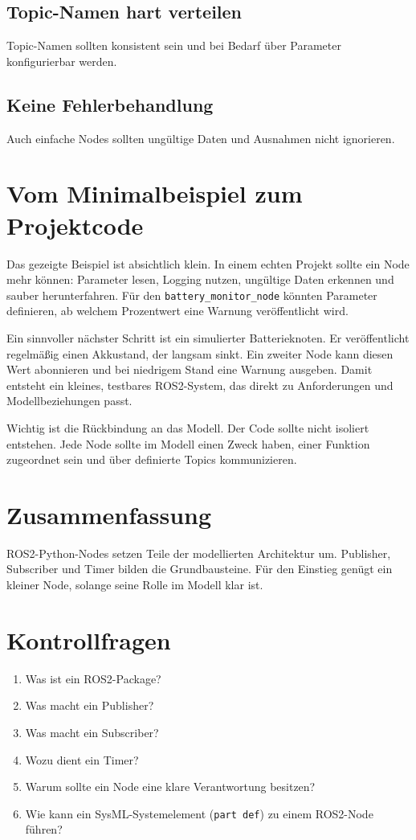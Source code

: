 \subsection{Topic-Namen hart verteilen}
Topic-Namen sollten konsistent sein und bei Bedarf über Parameter konfigurierbar werden.

\subsection{Keine Fehlerbehandlung}
Auch einfache Nodes sollten ungültige Daten und Ausnahmen nicht ignorieren.

\section{Vom Minimalbeispiel zum Projektcode}
Das gezeigte Beispiel ist absichtlich klein. In einem echten Projekt sollte ein Node mehr können: Parameter lesen, Logging nutzen, ungültige Daten erkennen und sauber herunterfahren. Für den \texttt{battery\_monitor\_node} könnten Parameter definieren, ab welchem Prozentwert eine Warnung veröffentlicht wird.

Ein sinnvoller nächster Schritt ist ein simulierter Batterieknoten. Er veröffentlicht regelmäßig einen Akkustand, der langsam sinkt. Ein zweiter Node kann diesen Wert abonnieren und bei niedrigem Stand eine Warnung ausgeben. Damit entsteht ein kleines, testbares ROS2-System, das direkt zu Anforderungen und Modellbeziehungen passt.

Wichtig ist die Rückbindung an das Modell. Der Code sollte nicht isoliert entstehen. Jede Node sollte im Modell einen Zweck haben, einer Funktion zugeordnet sein und über definierte Topics kommunizieren.

\section{Zusammenfassung}
ROS2-Python-Nodes setzen Teile der modellierten Architektur um. Publisher, Subscriber und Timer bilden die Grundbausteine. Für den Einstieg genügt ein kleiner Node, solange seine Rolle im Modell klar ist.

\section{Kontrollfragen}
\begin{enumerate}
    \item Was ist ein ROS2-Package?
    \item Was macht ein Publisher?
    \item Was macht ein Subscriber?
    \item Wozu dient ein Timer?
    \item Warum sollte ein Node eine klare Verantwortung besitzen?
    \item Wie kann ein SysML-Systemelement (\texttt{part def}) zu einem ROS2-Node führen?
\end{enumerate}

